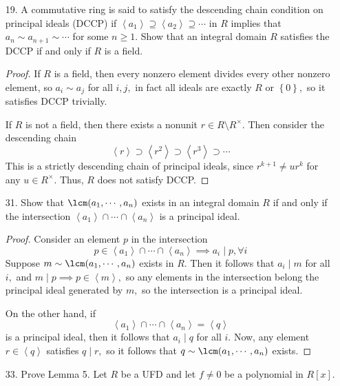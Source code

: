 \documentclass{article}
\begin{document}
\begin{itemize}
\begin{enumerate}[(a)]
		\end{enumerate}

	\item[19.] A commutative ring is said to satisfy the descending chain condition on principal ideals (DCCP) if $\left< a_1\right>\supseteq\left< a_2\right>\supseteq\cdots$ in $R$ implies that $a_n\sim a_{n+1}\sim\cdots$ for some $n\ge 1.$ Show that an integral domain $R$ satisfies the DCCP if and only if $R$ is a field.
		\begin{proof}
			If $R$ is a field, then every nonzero element divides every other nonzero element, so $a_i\sim a_j$ for all $i, j,$ in fact all ideals are exactly $R$ or $\left\{ 0 \right\},$ so it satisfies DCCP trivially. 

			If $R$ is not a field, then there exists a nonunit $r\in R\setminus R^\times.$ Then consider the descending chain
			\[\left< r\right>\supset \left< r^2\right> \supset \left< r^3\right> \supset \cdots\]
			This is a strictly descending chain of principal ideals, since $r^{k+1}\neq ur^k$ for any $u\in R^\times.$ Thus, $R$ does not satisfy DCCP.
		\end{proof}

	\item[31.] Show that $\lcm(a_1, \cdots, a_n)$ exists in an integral domain $R$ if and only if the intersection $\left< a_1\right>\cap\cdots\cap \left< a_n\right>$ is a principal ideal.
		\begin{proof}
			Consider an element $p$ in the intersection
			\[p\in\left< a_1\right>\cap \cdots \cap \left< a_n\right>\implies a_i\mid p, \forall i\]
			Suppose $m\sim\lcm (a_1, \cdots, a_n)$ exists in $R.$ Then it follows that $a_i\mid m$ for all $i,$ and $m\mid p\implies p\in \left< m\right>,$ so any elements in the intersection belong the principal ideal generated by $m,$ so the intersection is a principal ideal.

			On the other hand, if 
			\[\left< a_1\right>\cap\cdots\cap\left< a_n\right>=\left< q\right>\]
			is a principal ideal, then it follows that $a_i\mid q$ for all $i.$ Now, any element $r\in\left< q\right>$ satisfies $q\mid r,$ so it follows that $q\sim \lcm(a_1, \cdots, a_n)$ exists.
		\end{proof}
		
		\newpage
	\item[33.] Prove Lemma 5. Let $R$ be a UFD and let $f\neq 0$ be a polynomial in $R[x].$ 


\end{itemize}
\end{document}
